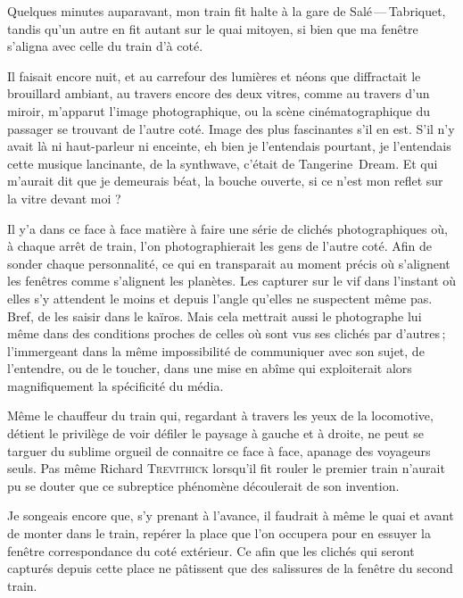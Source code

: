 \begin{prose}
  Quelques minutes auparavant, mon train fit halte à la gare de Salé\,—\,Tabriquet, tandis qu’un autre en fit autant sur le quai mitoyen, si bien que ma fenêtre s’aligna avec celle du train d’à coté.

  Il faisait encore nuit, et au carrefour des lumières et néons que diffractait le brouillard ambiant, au travers encore des deux vitres, comme au travers d’un miroir, m’apparut l’image photographique, ou la scène cinématographique  du passager se trouvant de l’autre coté. Image des plus fascinantes s’il en est. S’il n’y avait là ni haut-parleur ni enceinte, eh bien je l’entendais pourtant, je l’entendais cette musique lancinante, de la synthwave, c’était  de Tangerine~Dream. Et qui m’aurait dit que je demeurais béat, la bouche ouverte, si ce n’est mon reflet sur la vitre devant moi ? 


  Il y’a dans ce face à face matière à faire une série de clichés photographiques où, à chaque arrêt de train, l’on photographierait les gens de l’autre coté.
Afin de  sonder chaque personnalité, ce qui en transparait au moment précis où s’alignent les fenêtres comme s’alignent les planètes. Les capturer sur le vif dans l’instant où elles s’y attendent le moins et depuis l’angle qu’elles ne suspectent même pas. Bref, de les saisir dans le kaïros. Mais cela mettrait aussi le photographe lui même dans des conditions proches de celles où sont vus ses clichés par d’autres\,; l’immergeant dans la même impossibilité de communiquer avec son sujet, de l’entendre, ou de le toucher, dans une mise en abîme qui exploiterait alors magnifiquement la spécificité du média.

  Même le chauffeur du train qui, regardant à travers les yeux de la locomotive, détient le privilège de voir défiler le paysage à gauche et à droite, ne peut se targuer du sublime orgueil de connaitre ce face à face, apanage des voyageurs seuls. Pas même Richard \textsc{Trevithick} lorsqu’il fit rouler le premier train n’aurait pu se douter que ce subreptice phénomène découlerait de son invention.

Je songeais encore que, s’y prenant à l’avance, il faudrait à même le quai et avant de monter dans le train, repérer la place que l’on occupera pour en essuyer la fenêtre correspondance du coté extérieur. Ce afin que les clichés qui seront capturés depuis cette place ne pâtissent que des salissures de la fenêtre du second train.



\end{prose}

